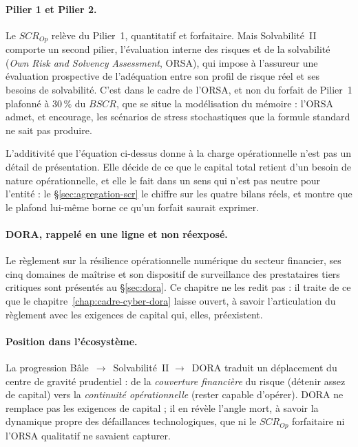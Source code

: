 \paragraph{Pilier 1 et Pilier 2.} Le $SCR_{Op}$ relève du Pilier~1, quantitatif et
forfaitaire. Mais Solvabilité~II comporte un second pilier, l'évaluation interne des
risques et de la solvabilité (\emph{Own Risk and Solvency Assessment}, ORSA), qui impose
à l'assureur une évaluation prospective de l'adéquation entre son profil de risque réel
et ses besoins de solvabilité. C'est dans le cadre de l'ORSA, et non du forfait de
Pilier~1 plafonné à $30\,\%$ du $BSCR$, que se situe la modélisation du
mémoire : l'ORSA admet, et encourage, les scénarios de stress stochastiques que la formule
standard ne sait pas produire.

L'additivité que l'équation ci-dessus donne à la charge opérationnelle n'est pas un détail
de présentation. Elle décide de ce que le capital total retient d'un besoin de nature
opérationnelle, et elle le fait dans un sens qui n'est pas neutre pour l'entité : le
\S\ref{sec:agregation-scr} le chiffre sur les quatre bilans réels, et montre que le plafond
lui-même borne ce qu'un forfait saurait exprimer.

\paragraph{DORA, rappelé en une ligne et non réexposé.} Le règlement sur la résilience
opérationnelle numérique du secteur financier, ses cinq domaines de maîtrise et son dispositif de
surveillance des prestataires tiers critiques sont présentés au \S\ref{sec:dora}. Ce chapitre ne
les redit pas : il traite de ce que le chapitre~\ref{chap:cadre-cyber-dora} laisse ouvert, à
savoir l'articulation du règlement avec les exigences de capital qui, elles, préexistent.

\paragraph{Position dans l'écosystème.} La progression Bâle~$\rightarrow$~Solvabilité~II
$\rightarrow$~DORA traduit un déplacement du centre de gravité prudentiel : de la
\emph{couverture financière} du risque (détenir assez de capital) vers la \emph{continuité
opérationnelle} (rester capable d'opérer). DORA ne remplace pas les exigences de capital ;
il en révèle l'angle mort, à savoir la dynamique propre des défaillances technologiques,
que ni le $SCR_{Op}$ forfaitaire ni l'ORSA qualitatif ne savaient capturer.

